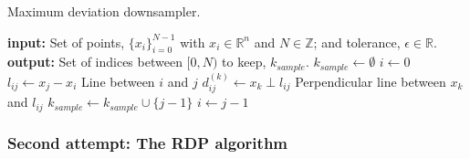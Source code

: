 \documentclass[a4paper,11pt]{article}
\begin{document}
\begin{algorithm}
	\caption{Maximum deviation downsampler.}
	\label{alg:max-dev-downsampler}
	\begin{algorithmic}[1]
		\State \textbf{input:} Set of points, $\{x_i\}_{i=0}^{N-1}$ with $x_i \in \mathbb{R}^n$ and $N \in \mathbb{Z}$; and tolerance, $\epsilon \in \mathbb{R}$.
        \State \textbf{output:} Set of indices between $[0, N)$ to keep, $k_{sample}$.
        \State $k_{sample} \gets \emptyset$
        \State $i \gets 0$
			\State $l_{ij} \gets x_j - x_i$
            \Comment Line between $i$ and $j$
                \State $d^{(k)}_{ij} \gets x_k \perp l_{ij}$
                \Comment Perpendicular line between $x_k$ and $l_{ij}$
            \EndFor
                \State $k_{sample} \gets k_{sample} \cup \{j - 1 \}$
                \State $i \gets j - 1$
            \EndIf
		\EndFor
\end{algorithmic}
\end{algorithm}




\subsubsection{Second attempt: The RDP algorithm}
\end{document}
